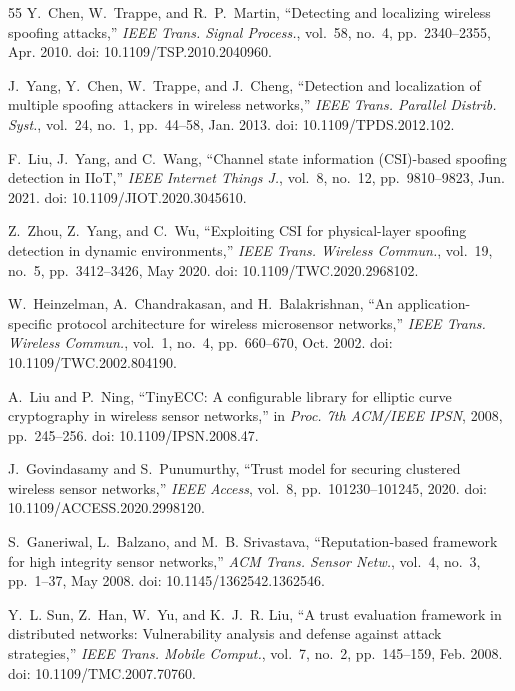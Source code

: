 \documentclass[journal]{IEEEtran}
\begin{document}
\begin{thebibliography}{55}
Y.~Chen, W.~Trappe, and R.~P.~Martin, ``Detecting and localizing wireless spoofing attacks,'' \textit{IEEE Trans. Signal Process.}, vol.~58, no.~4, pp.~2340--2355, Apr. 2010. doi: 10.1109/TSP.2010.2040960.

J.~Yang, Y.~Chen, W.~Trappe, and J.~Cheng, ``Detection and localization of multiple spoofing attackers in wireless networks,'' \textit{IEEE Trans. Parallel Distrib. Syst.}, vol.~24, no.~1, pp.~44--58, Jan. 2013. doi: 10.1109/TPDS.2012.102.

F.~Liu, J.~Yang, and C.~Wang, ``Channel state information (CSI)-based spoofing detection in IIoT,'' \textit{IEEE Internet Things J.}, vol.~8, no.~12, pp.~9810--9823, Jun. 2021. doi: 10.1109/JIOT.2020.3045610.

Z.~Zhou, Z.~Yang, and C.~Wu, ``Exploiting CSI for physical-layer spoofing detection in dynamic environments,'' \textit{IEEE Trans. Wireless Commun.}, vol.~19, no.~5, pp.~3412--3426, May 2020. doi: 10.1109/TWC.2020.2968102.

W.~Heinzelman, A.~Chandrakasan, and H.~Balakrishnan, ``An application-specific protocol architecture for wireless microsensor networks,'' \textit{IEEE Trans. Wireless Commun.}, vol.~1, no.~4, pp.~660--670, Oct. 2002. doi: 10.1109/TWC.2002.804190.

A.~Liu and P.~Ning, ``TinyECC: A configurable library for elliptic curve cryptography in wireless sensor networks,'' in \textit{Proc. 7th ACM/IEEE IPSN}, 2008, pp.~245--256. doi: 10.1109/IPSN.2008.47.

J.~Govindasamy and S.~Punumurthy, ``Trust model for securing clustered wireless sensor networks,'' \textit{IEEE Access}, vol.~8, pp.~101230--101245, 2020. doi: 10.1109/ACCESS.2020.2998120.

S.~Ganeriwal, L.~Balzano, and M.~B. Srivastava, ``Reputation-based framework for high integrity sensor networks,'' \textit{ACM Trans. Sensor Netw.}, vol.~4, no.~3, pp.~1--37, May 2008. doi: 10.1145/1362542.1362546.

Y.~L. Sun, Z.~Han, W.~Yu, and K.~J.~R. Liu, ``A trust evaluation framework in distributed networks: Vulnerability analysis and defense against attack strategies,'' \textit{IEEE Trans. Mobile Comput.}, vol.~7, no.~2, pp.~145--159, Feb. 2008. doi: 10.1109/TMC.2007.70760.


\end{thebibliography}
\end{document}
